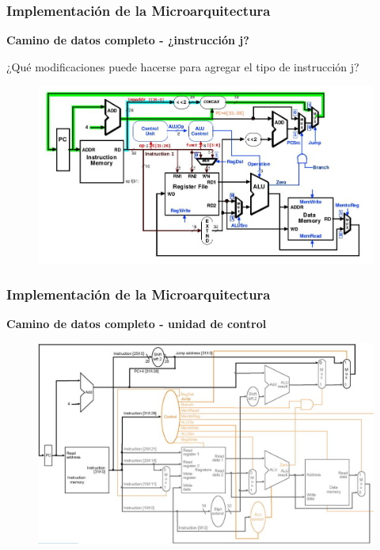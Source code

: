 \documentclass[aspectratio=169,compress]{beamer}
\begin{document}
\begin{footnotesize}
\begin{frame}
\frametitle{Implementación de la Microarquitectura}
\begin{center}\textbf{Camino de datos completo - ¿instrucción j?}\end{center}
¿Qué modificaciones puede hacerse para agregar el tipo de instrucción j?
\begin{figure}
\includegraphics[scale=0.3]{images/j.jpg} 
\end{figure}

\end{frame}




\begin{frame}
\frametitle{Implementación de la Microarquitectura}
\begin{center}\textbf{Camino de datos completo - unidad de control}\end{center}
\begin{figure}
\includegraphics[scale=0.3]{images/cpu-signals-2.jpg} 
\end{figure}

\end{frame}



\end{footnotesize}
\end{document}
